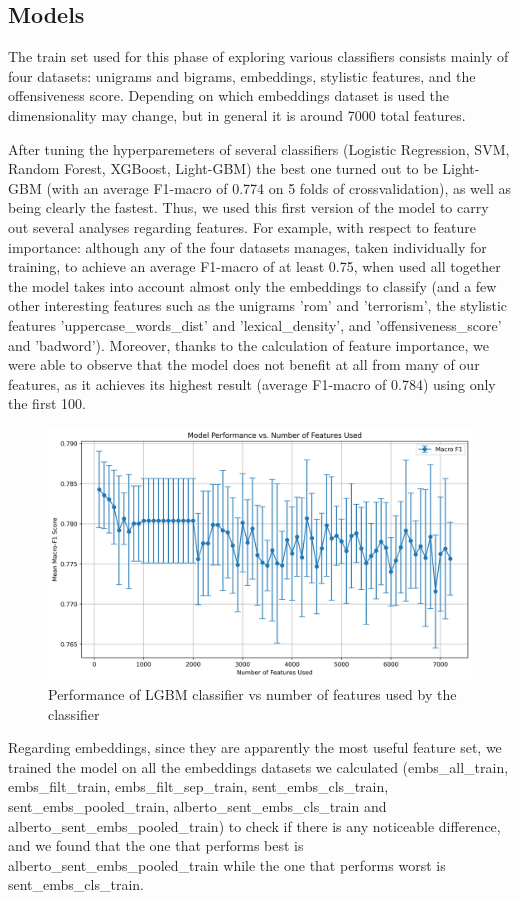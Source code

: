 \subsection{Models}

The train set used for this phase of exploring various classifiers consists mainly of four datasets: unigrams and bigrams, embeddings, stylistic features, and the offensiveness score. Depending on which embeddings dataset is used the dimensionality may change, but in general it is around 7000 total features.

After tuning the hyperparemeters of several classifiers (Logistic Regression, SVM, Random Forest, XGBoost, Light-GBM) the best one turned out to be Light-GBM (with an average F1-macro of 0.774 on 5 folds of crossvalidation), as well as being clearly the fastest. Thus, we used this first version of the model to carry out several analyses regarding features.
For example, with respect to feature importance: although any of the four datasets manages, taken individually for training, to achieve an average F1-macro of at least 0.75, when used all together the model takes into account almost only the embeddings to classify (and a few other interesting features such as the unigrams 'rom' and 'terrorism', the stylistic features 'uppercase\_words\_dist' and 'lexical\_density', and 'offensiveness\_score' and 'badword').
Moreover, thanks to the calculation of feature importance, we were able to observe that the model does not benefit at all from many of our features, as it achieves its highest result (average F1-macro of 0.784) using only the first 100.

\begin{figure}
    \includegraphics[width=\columnwidth]{../../results/images/model_n_feats.png}
    \caption{Performance of LGBM classifier vs number of features used by the classifier}
\end{figure}
Regarding embeddings, since they are apparently the most useful feature set, we trained the model on all the embeddings datasets we calculated (embs\_all\_train, embs\_filt\_train, embs\_filt\_sep\_train, sent\_embs\_cls\_train, sent\_embs\_pooled\_train, alberto\_sent\_embs\_cls\_train and alberto\_sent\_embs\_pooled\_train) to check if there is any noticeable difference, and we found that the one that performs best is alberto\_sent\_embs\_pooled\_train while the one that performs worst is sent\_embs\_cls\_train.

